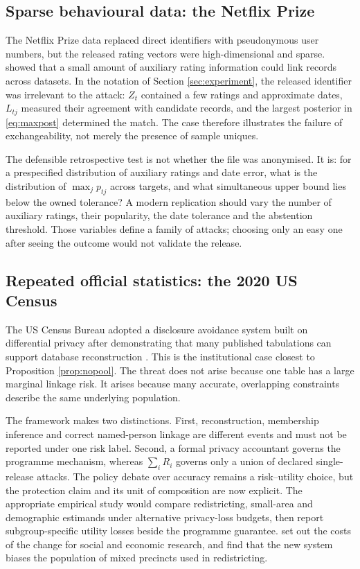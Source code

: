 \documentclass[11pt,a4paper]{article}
\theoremstyle{plain}
\theoremstyle{definition}
\begin{document}
\subsection{Sparse behavioural data: the Netflix Prize}

The Netflix Prize data replaced direct identifiers with pseudonymous user
numbers, but the released rating vectors were high-dimensional and sparse.
\citet{narayanan2008} showed that a small amount of auxiliary rating information
could link records across datasets. In the notation of Section
\ref{sec:experiment}, the released identifier was irrelevant to the attack:
$Z_t$ contained a few ratings and approximate dates, $L_{tj}$ measured their
agreement with candidate records, and the largest posterior in
\eqref{eq:maxpost} determined the match. The case therefore illustrates the
failure of exchangeability, not merely the presence of sample uniques.

The defensible retrospective test is not whether the file was anonymised. It is:
for a prespecified distribution of auxiliary ratings and date error, what is the
distribution of $\max_j p_{tj}$ across targets, and what simultaneous upper bound
lies below the owned tolerance? A modern replication should vary the number of
auxiliary ratings, their popularity, the date tolerance and the abstention
threshold. Those variables define a family of attacks; choosing only an easy one
after seeing the outcome would not validate the release.

\subsection{Repeated official statistics: the 2020 US Census}

The US Census Bureau adopted a disclosure avoidance system built on differential
privacy \citep{abowd2018} after demonstrating that many published tabulations can support database
reconstruction \citep{garfinkel2019,abowd2022,abowd2023}. This is the
institutional case closest to Proposition \ref{prop:nopool}. The threat does not
arise because one table has a large marginal linkage risk. It arises because many
accurate, overlapping constraints describe the same underlying population.

The framework makes two distinctions. First, reconstruction, membership inference
and correct named-person linkage are different events and must not be reported
under one risk label. Second, a formal privacy accountant governs the programme
mechanism, whereas $\sum_i R_i$ governs only a union of declared single-release
attacks. The policy debate over accuracy remains a risk--utility choice, but the
protection claim and its unit of composition are now explicit. The appropriate
empirical study would compare redistricting, small-area and demographic estimands
under alternative privacy-loss budgets, then report subgroup-specific utility
losses beside the programme guarantee. \citet{ruggles2019} set out the costs of
the change for social and economic research, and \citet{kenny2021} find that the
new system biases the population of mixed precincts used in redistricting.
\end{document}
